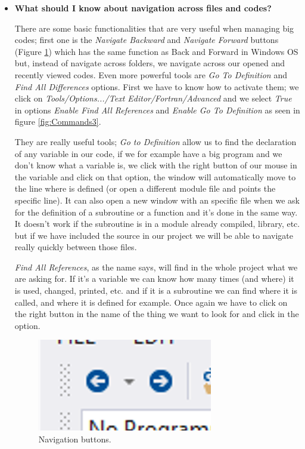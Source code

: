 \begin{itemize}
    \item \textbf{What should I know about navigation across files and codes?}
    
    There are some basic functionalities that are very useful when managing big codes; first one is the \textit{Navigate Backward} and \textit{Navigate Forward} buttons (Figure \ref{fig:Commands2}) which has the same function as Back and Forward in Windows OS but, instead of navigate across folders, we navigate across our opened and recently viewed codes. Even more powerful tools are \textit{Go To Definition} and \textit{Find All Differences} options. First we have to know how to activate them; we click on \textit{Tools/Options.../Text Editor/Fortran/Advanced} and we select \textit{True} in options \textit{Enable Find All References} and \textit{Enable Go To Definition} as seen in figure \ref{fig:Commands3}. 
    
    They are really useful tools; \textit{Go to Definition} allow us to find the declaration of any variable in our code, if we for example have a big program and we don't know what a variable is, we click with the right button of our mouse in the variable and click on that option, the window will automatically move to the line where is defined (or open a different module file and points the specific line). It can also open a new window with an specific file when we ask for the definition of a subroutine or a function and it's done in the same way. It doesn't work if the subroutine is in a module already compiled, library, etc. but if we have included the source in our project we will be able to navigate really quickly between those files.
    
    \textit{Find All References}, as the name says, will find in the whole project what we are asking for. If it's a variable we can know how many times (and where) it is used, changed, printed, etc. and if it is a subroutine we can find where it is called, and where it is defined for example. Once again we have to click on the right button in the name of the thing we want to look for and click in the option.
    
    \begin{figure}
        \centering
        \includegraphics[width= 0.5 \textwidth]{Figures/Commands2}
        \caption{Navigation buttons.}
        \label{fig:Commands2}
    \end{figure}
    

\end{itemize}
